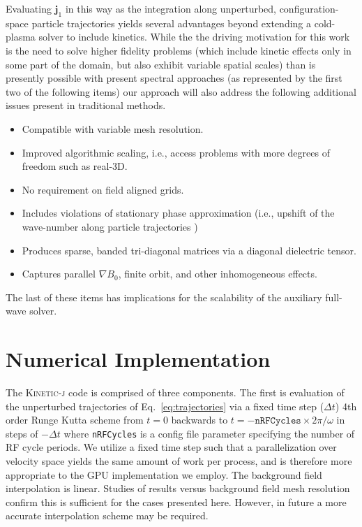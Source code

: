 \documentclass[final,5p,times,twocolumn]{elsarticle}
\newcounter{bla}
\renewcommand{\vec}[1]{\mathbf{#1}}
\newcommand{\kj}{\textsc{Kinetic-j}\xspace}
\newcommand{\jp}{\ensuremath{\vec{j}_{\mathrm{1}}}\xspace}
\begin{document}
Evaluating $\jp$ in this way as the integration along unperturbed, configuration-space particle trajectories yields several advantages beyond extending a cold-plasma solver to include kinetics. While the the driving motivation for this work is the need to solve higher fidelity problems (which include kinetic effects only in some part of the domain, but also exhibit variable spatial scales) than is presently possible with present spectral approaches (as represented by the first two of the following items) our approach will also address the following additional issues present in traditional methods. 
%
\begin{itemize}
\item{Compatible with variable mesh resolution.}
\item{Improved algorithmic scaling, i.e., access problems with more degrees of freedom such as real-3D.}
\item{No requirement on field aligned grids.}
\item{Includes violations of stationary phase approximation (i.e., upshift of the wave-number along particle trajectories \cite[]{berry2016})}
\item{Produces sparse, banded tri-diagonal matrices via a diagonal dielectric tensor.}
\item{Captures parallel $\nabla B_{\mathrm{0}}$, finite orbit, and other inhomogeneous effects.}
\end{itemize}
%
The last of these items has implications for the scalability of the auxiliary full-wave solver.
%
\section{Numerical Implementation}
\label{section:implementation}
%
The \kj code is comprised of three components. The first is evaluation of the unperturbed trajectories of Eq.~\ref{eq:trajectories} via a fixed time step ($\Delta t$) 4th order Runge Kutta scheme from $t=0$ backwards to $t=-\texttt{nRFCycles}\times{2\pi}/\omega$ in steps of $-\Delta t$ where \texttt{nRFCycles} is a config file parameter specifying the number of RF cycle periods. We utilize a fixed time step such that a parallelization over velocity space yields the same amount of work per process, and is therefore more appropriate to the GPU implementation we employ. The background field interpolation is linear. Studies of results versus background field mesh resolution confirm this is sufficient for the cases presented here. However, in future a more accurate interpolation scheme may be required.
\end{document}
